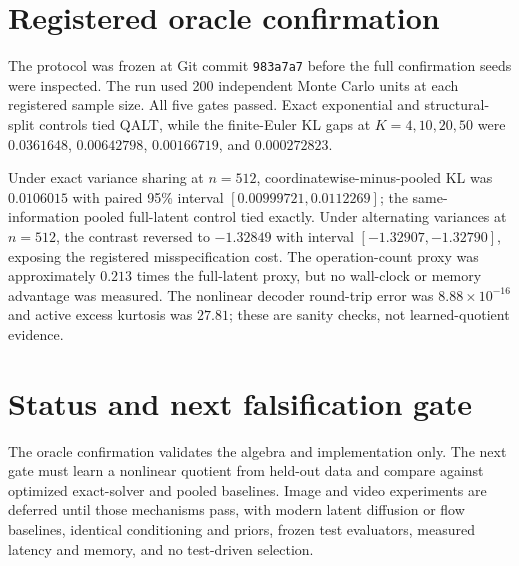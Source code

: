 \documentclass[11pt]{article}
\begin{document}
\section{Registered oracle confirmation}

The protocol was frozen at Git commit \texttt{983a7a7} before the full confirmation seeds were inspected.  The run used 200 independent Monte Carlo units at each registered sample size.  All five gates passed.  Exact exponential and structural-split controls tied QALT, while the finite-Euler KL gaps at $K=4,10,20,50$ were $0.0361648$, $0.00642798$, $0.00166719$, and $0.000272823$.

Under exact variance sharing at $n=512$, coordinatewise-minus-pooled KL was $0.0106015$ with paired 95\% interval $[0.00999721,0.0112269]$; the same-information pooled full-latent control tied exactly.  Under alternating variances at $n=512$, the contrast reversed to $-1.32849$ with interval $[-1.32907,-1.32790]$, exposing the registered misspecification cost.  The operation-count proxy was approximately $0.213$ times the full-latent proxy, but no wall-clock or memory advantage was measured.  The nonlinear decoder round-trip error was $8.88\times10^{-16}$ and active excess kurtosis was $27.81$; these are sanity checks, not learned-quotient evidence.

\section{Status and next falsification gate}

The oracle confirmation validates the algebra and implementation only.  The next gate must learn a nonlinear quotient from held-out data and compare against optimized exact-solver and pooled baselines.  Image and video experiments are deferred until those mechanisms pass, with modern latent diffusion or flow baselines, identical conditioning and priors, frozen test evaluators, measured latency and memory, and no test-driven selection.
\end{document}
